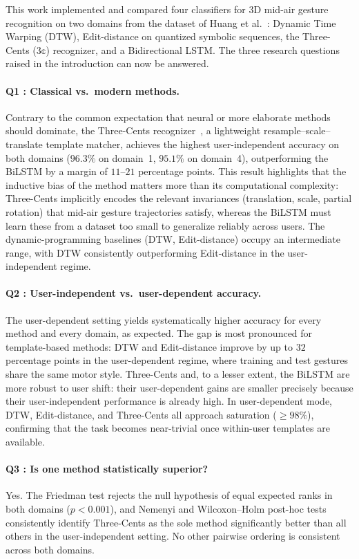 
This work implemented and compared four classifiers for 3D mid-air gesture
recognition on two domains from the dataset of Huang et al.~\cite{Huang2019}:
Dynamic Time Warping (DTW), Edit-distance on quantized symbolic sequences,
the Three-Cents ($3\mathbb{c}$) recognizer, and a Bidirectional LSTM.
The three research questions raised in the introduction can now be answered.

\paragraph{Q1 : Classical vs.\ modern methods.}
Contrary to the common expectation that neural or more elaborate methods
should dominate, the Three-Cents recognizer~\cite{Caputo2018}, a lightweight
resample--scale--translate template matcher, achieves the highest
user-independent accuracy on both domains ($96.3\%$ on domain~1,
$95.1\%$ on domain~4), outperforming the BiLSTM by a margin of $11$--$21$
percentage points. This result highlights that the inductive bias of
the method matters more than its computational complexity: Three-Cents
implicitly encodes the relevant invariances (translation, scale, partial
rotation) that mid-air gesture trajectories satisfy, whereas the BiLSTM must
learn these from a dataset too small to generalize reliably across users.
The dynamic-programming baselines (DTW, Edit-distance) occupy an intermediate
range, with DTW consistently outperforming Edit-distance in the
user-independent regime.

\paragraph{Q2 : User-independent vs.\ user-dependent accuracy.}
The user-dependent setting yields systematically higher accuracy for every
method and every domain, as expected. The gap is most pronounced for
template-based methods: DTW and Edit-distance improve by up to $32$ percentage
points in the user-dependent regime, where training and test gestures share
the same motor style. Three-Cents and, to a lesser extent, the BiLSTM are
more robust to user shift: their user-dependent gains are smaller precisely
because their user-independent performance is already high. In user-dependent
mode, DTW, Edit-distance, and Three-Cents all approach saturation
($\geq 98\%$), confirming that the task becomes near-trivial once
within-user templates are available.

\paragraph{Q3 : Is one method statistically superior?}
Yes. The Friedman test rejects the null hypothesis of equal expected ranks in
both domains ($p < 0.001$), and Nemenyi and Wilcoxon--Holm post-hoc tests
consistently identify Three-Cents as the sole method significantly better than
all others in the user-independent setting. No other pairwise ordering is
consistent across both domains.

